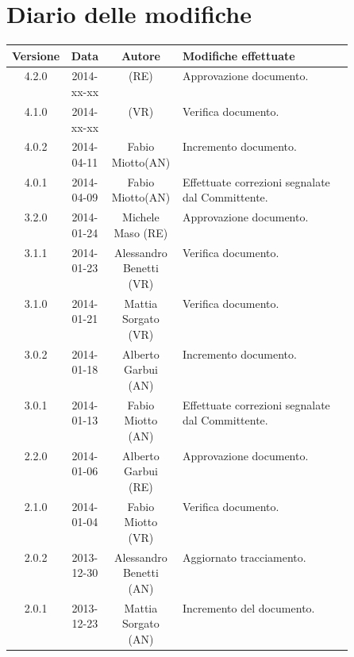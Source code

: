 
\newpage
\section{Diario delle modifiche}
\begin{center}
\begin{longtable}{|c|c|c|p{0.5\linewidth}|}
\toprule
\textbf{Versione} & \textbf{Data} & \textbf{Autore} & \textbf{Modifiche effettuate}\\

\midrule
4.2.0 & 2014-xx-xx &   (RE) & Approvazione documento.\\
\midrule
4.1.0 & 2014-xx-xx &   (VR) & Verifica documento.\\
\midrule
4.0.2 & 2014-04-11 &  Fabio Miotto(AN) & Incremento documento.\\
\midrule
4.0.1 & 2014-04-09 &  Fabio Miotto(AN) & Effettuate correzioni segnalate dal Committente.\\

\midrule
3.2.0 & 2014-01-24 & Michele Maso (RE) & Approvazione documento.\\
\midrule
3.1.1 & 2014-01-23 & Alessandro Benetti (VR) & Verifica documento.\\
\midrule
3.1.0 & 2014-01-21 & Mattia Sorgato (VR) & Verifica documento.\\
\midrule
3.0.2 & 2014-01-18 & Alberto Garbui (AN) & Incremento documento.\\
\midrule
3.0.1 & 2014-01-13 & Fabio Miotto (AN) & Effettuate correzioni segnalate dal Committente.\\

\midrule
2.2.0 & 2014-01-06 & Alberto Garbui (RE) & Approvazione documento.\\
\midrule
2.1.0 & 2014-01-04 & Fabio Miotto (VR) & Verifica documento.\\
\midrule
2.0.2 & 2013-12-30 & Alessandro Benetti (AN) & Aggiornato tracciamento.\\
\midrule
2.0.1 & 2013-12-23 & Mattia Sorgato (AN) & Incremento del documento.\\


\end{longtable}
\end{center}
